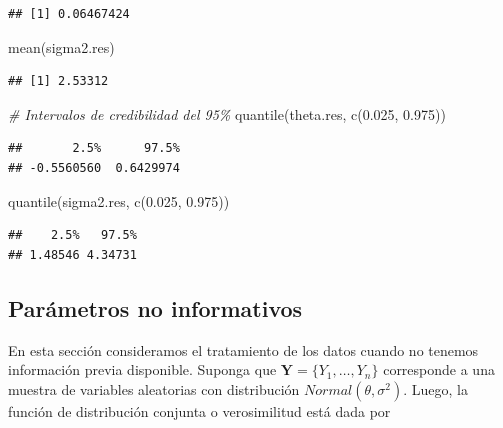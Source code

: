 \documentclass[
  10pt,
  spanish,
]{book}
\newenvironment{Shaded}{\begin{snugshade}}{\end{snugshade}}
\newcommand{\CommentTok}[1]{\textcolor[rgb]{0.56,0.35,0.01}{\textit{#1}}}
\newcommand{\FloatTok}[1]{\textcolor[rgb]{0.00,0.00,0.81}{#1}}
\newcommand{\FunctionTok}[1]{\textcolor[rgb]{0.00,0.00,0.00}{#1}}
\newcommand{\NormalTok}[1]{#1}
\theoremstyle{definition}
\theoremstyle{definition}
\theoremstyle{definition}
\theoremstyle{definition}
\theoremstyle{remark}
\begin{document}
\begin{verbatim}
## [1] 0.06467424
\end{verbatim}

\begin{Shaded}
\begin{Highlighting}[]
\FunctionTok{mean}\NormalTok{(sigma2.res)}
\end{Highlighting}
\end{Shaded}

\begin{verbatim}
## [1] 2.53312
\end{verbatim}

\begin{Shaded}
\begin{Highlighting}[]
\CommentTok{\# Intervalos de credibilidad del 95\%}
\FunctionTok{quantile}\NormalTok{(theta.res, }\FunctionTok{c}\NormalTok{(}\FloatTok{0.025}\NormalTok{, }\FloatTok{0.975}\NormalTok{))}
\end{Highlighting}
\end{Shaded}

\begin{verbatim}
##       2.5%      97.5% 
## -0.5560560  0.6429974
\end{verbatim}

\begin{Shaded}
\begin{Highlighting}[]
\FunctionTok{quantile}\NormalTok{(sigma2.res, }\FunctionTok{c}\NormalTok{(}\FloatTok{0.025}\NormalTok{, }\FloatTok{0.975}\NormalTok{))}
\end{Highlighting}
\end{Shaded}

\begin{verbatim}
##    2.5%   97.5% 
## 1.48546 4.34731
\end{verbatim}

\hypertarget{paruxe1metros-no-informativos}{%
\subsection{Parámetros no informativos}\label{paruxe1metros-no-informativos}}

En esta sección consideramos el tratamiento de los datos cuando no tenemos información previa disponible. Suponga que \(\mathbf{Y}=\{Y_1,\ldots,Y_n\}\) corresponde a una muestra de variables aleatorias con distribución \(Normal(\theta, \sigma^2)\). Luego, la función de distribución conjunta o verosimilitud está dada por
\end{document}
